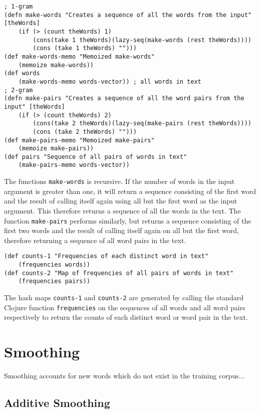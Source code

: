 \begin{lstlisting}
; 1-gram
(defn make-words "Creates a sequence of all the words from the input" [theWords] 
	(if (> (count theWords) 1) 
		(cons(take 1 theWords)(lazy-seq(make-words (rest theWords)))) 
		(cons (take 1 theWords) "")))
(def make-words-memo "Memoized make-words" 
	(memoize make-words))
(def words 
	(make-words-memo words-vector)) ; all words in text
; 2-gram
(defn make-pairs "Creates a sequence of all the word pairs from the input" [theWords] 
	(if (> (count theWords) 2) 
		(cons(take 2 theWords)(lazy-seq(make-pairs (rest theWords)))) 
		(cons (take 2 theWords) "")))
(def make-pairs-memo "Memoized make-pairs" 
	(memoize make-pairs))
(def pairs "Sequence of all pairs of words in text" 
	(make-pairs-memo words-vector))
\end{lstlisting}

The functions \lstinline!make-words! is recursive. If the number of words in the input argument is greater than one, it will return a sequence consisting of the first word and the result of calling itself again using all but the first word as the input argument. This therefore returns a sequence of all the words in the text. The function \lstinline!make-pairs! performs similarly, but returns a sequence consisting of the first two words and the result of calling itself again on all but the first word, therefore returning a sequence of all word pairs in the text.

\begin{lstlisting}
(def counts-1 "Frequencies of each distinct word in text" 
	(frequencies words))
(def counts-2 "Map of frequencies of all pairs of words in text" 
	(frequencies pairs))
\end{lstlisting}

The hash maps \lstinline!counts-1! and \lstinline!counts-2! are generated by calling the standard Clojure function \lstinline!frequencies! on the sequences of all words and all word pairs respectively to return the counts of each distinct word or word pair in the text. 


\section{Smoothing} \label{sec:smoothing}

Smoothing accounts for new words which do not exist in the training corpus...

\subsection{Additive Smoothing}

